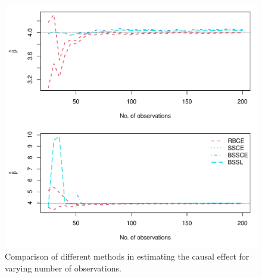 \documentclass[preprint,12pt]{elsarticle}
\begin{document}
\begin{figure}
    \centering
    \includegraphics[width = 0.9\linewidth]{treat_obs.pdf}
    \caption{Comparison of different methods in estimating the causal effect for varying number of observations.}
    \label{fig:comp:trt}
\end{figure}
\end{document}
